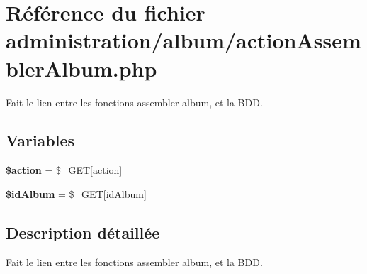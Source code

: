 \hypertarget{actionAssemblerAlbum_8php}{}\section{Référence du fichier administration/album/action\+Assembler\+Album.php}
\label{actionAssemblerAlbum_8php}


Fait le lien entre les fonctions assembler album, et la B\+DD.  


\subsection*{Variables}
\begin{DoxyCompactItemize}
\item 
\mbox{\label{actionAssemblerAlbum_8php_aa698a3e72116e8e778be0e95d908ee30}} 
{\bfseries \$action} = \$\+\_\+\+G\+ET\mbox{[}\textquotesingle{}action\textquotesingle{}\mbox{]}
\item 
\mbox{\label{actionAssemblerAlbum_8php_a72867a182874faddb69d6feb58ce5c00}} 
{\bfseries \$id\+Album} = \$\+\_\+\+G\+ET\mbox{[}\textquotesingle{}id\+Album\textquotesingle{}\mbox{]}
\end{DoxyCompactItemize}


\subsection{Description détaillée}
Fait le lien entre les fonctions assembler album, et la B\+DD. 

